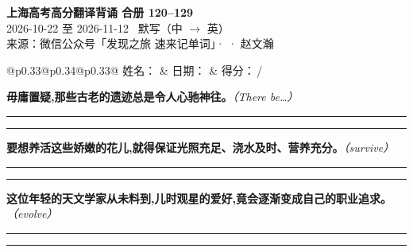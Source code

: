 \documentclass[11pt,a4paper]{article}
\newcommand{\num}[1]{\makebox[1.9em][r]{#1.}\hspace{0.3em}}
\newcommand{\wline}{\noindent\rule{\linewidth}{0.4pt}}
\newcommand{\prompt}[1]{\emph{\textcolor{tipblue}{\small（#1）}}}
\begin{document}
\pagestyle{plain}
\begin{center}
{\LARGE\bfseries 上海高考高分翻译背诵 \quad 合册 120–129}\\[0.25em]
{\large 2026-10-22 至 2026-11-12 \quad\ 默写（中 $\to$ 英）}\\[0.35em]
{\footnotesize 来源：微信公众号「发现之旅 速来记单词」·  · 赵文瀚}
\end{center}

\vspace{0.4em}
\noindent\begin{tabular}{@{}p{0.33\textwidth}@{}p{0.34\textwidth}@{}p{0.33\textwidth}@{}}
姓名：\underline{\hspace{2.0cm}} & 日期：\underline{\hspace{2.0cm}} & 得分：\underline{\hspace{1.4cm}}\,/ \\
\end{tabular}

\vspace{0.5em}

\vspace{0.8em}
\vspace{0.35em}\vspace{0.15em}

\begin{minipage}{\linewidth}

\num{1}\textbf{毋庸置疑,那些古老的遗迹总是令人心驰神往。}\prompt{There be…}

\vspace{0.3em}

\wline\vspace{0.3em}
\wline

\end{minipage}

\begin{minipage}{\linewidth}

\num{2}\textbf{要想养活这些娇嫩的花儿,就得保证光照充足、浇水及时、营养充分。}\prompt{survive}

\vspace{0.3em}

\wline\vspace{0.3em}
\wline

\end{minipage}

\begin{minipage}{\linewidth}

\num{3}\textbf{这位年轻的天文学家从未料到,儿时观星的爱好,竟会逐渐变成自己的职业追求。}\prompt{evolve}

\vspace{0.3em}

\wline\vspace{0.3em}
\wline

\end{minipage}
\end{document}
